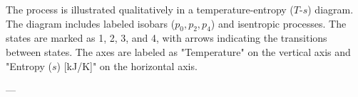 The process is illustrated qualitatively in a temperature-entropy (\( T \)-\( s \)) diagram. The diagram includes labeled isobars (\( p_0, p_2, p_4 \)) and isentropic processes. The states are marked as 1, 2, 3, and 4, with arrows indicating the transitions between states. The axes are labeled as "Temperature" on the vertical axis and "Entropy (\( s \)) [kJ/K]" on the horizontal axis.

---